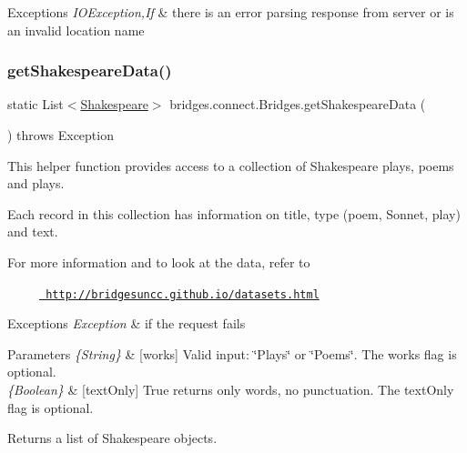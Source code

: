 \begin{DoxyExceptions}{Exceptions}
{\em I\+O\+Exception,If} & there is an error parsing response from server or is an invalid location name \\
\hline
\end{DoxyExceptions}
\mbox{\label{classbridges_1_1connect_1_1_bridges_adc8d19f28677afb03db53736455de2d0}} 
\subsubsection{\texorpdfstring{getShakespeareData()}{getShakespeareData()}\hspace{0.1cm}{\footnotesize\ttfamily [1/3]}}
{\footnotesize\ttfamily static List$<$\mbox{\hyperlink{classbridges_1_1data__src__dependent_1_1_shakespeare}{Shakespeare}}$>$ bridges.\+connect.\+Bridges.\+get\+Shakespeare\+Data (\begin{DoxyParamCaption}{ }\end{DoxyParamCaption}) throws Exception\hspace{0.3cm}{\ttfamily [static]}}

This helper function provides access to a collection of Shakespeare plays, poems and plays.

Each record in this collection has information on title, type (poem, Sonnet, play) and text. ~\newline


For more information and to look at the data, refer to 

~~~~~\href{http://bridgesuncc.github.io/datasets.html}{\texttt{ http\+://bridgesuncc.\+github.\+io/datasets.\+html}} 


\begin{DoxyExceptions}{Exceptions}
{\em Exception} & if the request fails\\
\hline
\end{DoxyExceptions}

\begin{DoxyParams}{Parameters}
{\em \{\+String\}} & \mbox{[}works\mbox{]} Valid input\+: \char`\"{}\+Plays\char`\"{} or \char`\"{}\+Poems\char`\"{}. The works flag is optional.\\
\hline
{\em \{\+Boolean\}} & \mbox{[}text\+Only\mbox{]} True returns only words, no punctuation. The text\+Only flag is optional.\\
\hline
\end{DoxyParams}
\begin{DoxyReturn}{Returns}
a list of Shakespeare objects. 
\end{DoxyReturn}
\mbox{\label{classbridges_1_1connect_1_1_bridges_a53ac587893826c57644f2e03b33ae455}} 
